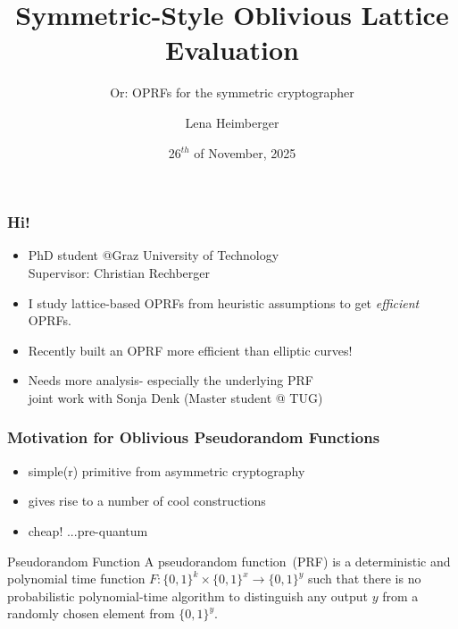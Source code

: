 \documentclass[10pt]{beamer}
\title{Symmetric-Style Oblivious Lattice Evaluation}
\subtitle{Or: OPRFs for the symmetric cryptographer}
\date{26$^{th}$ of November, 2025}
\author{Lena Heimberger}
\institute{NTU Singapore, School of Physical and Mathematical Sciences}
\begin{document}
\maketitle

\begin{frame}
  \frametitle{Hi!}
  \begin{itemize}
    \item PhD student @Graz University of Technology \\ Supervisor:
      Christian Rechberger\pause
    \item I study lattice-based OPRFs from heuristic assumptions to get
      \emph{efficient} OPRFs. \pause
    \item Recently built an OPRF more efficient than elliptic
      curves!~\cite{EC:HKLMRR25}\pause
    \item Needs more analysis- especially the underlying PRF\\ joint work with
      Sonja Denk (Master student @ TUG)

  \end{itemize}
\end{frame}


\begin{frame}
  \frametitle{Motivation for Oblivious Pseudorandom Functions}
  \begin{itemize}
    \item simple(r) primitive from asymmetric cryptography\pause
    \item gives rise to a number of cool constructions
    \item cheap! \pause...pre-quantum
  \end{itemize}
  \begin{exampleblock}{Pseudorandom Function}
    A pseudorandom function~(PRF) \cite{C:GolGolMic84,GolGolMic86} is a
    deterministic and polynomial time function $F \colon
    \{0,1\}^k\times\{0,1\}^x\rightarrow \{0,1\}^y$ such that
    there is no probabilistic polynomial-time algorithm
    to distinguish any output $y$ from a randomly chosen element from $\{0,1\}^y$.
    \label{def:prf}
  \end{exampleblock}
\end{frame}
\end{document}
